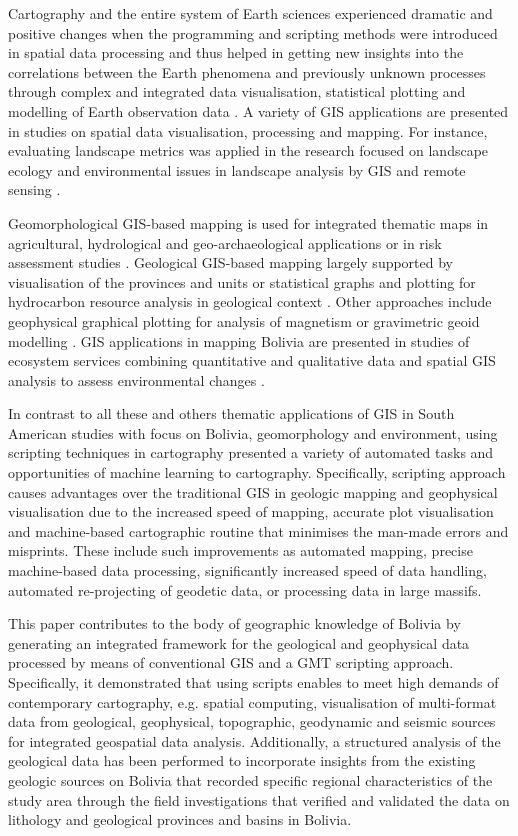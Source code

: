 \documentclass[data,article,submit,pdftex,moreauthors]{Definitions/mdpi}
\begin{document}
Cartography and the entire system of Earth sciences experienced dramatic and positive changes when the programming and scripting methods were introduced in spatial data processing and thus helped in getting new insights into the correlations between the Earth phenomena and previously unknown processes through complex and integrated data visualisation, statistical plotting and modelling of Earth observation data \cite{Bar,Lemenkova2019b,LOMBARDO,Lemenkova2020e}. A variety of GIS applications are presented in studies on spatial data visualisation, processing and mapping. For instance, evaluating landscape metrics was applied in the research focused on landscape ecology and environmental issues in landscape analysis by GIS and remote sensing \cite{Millington,Lemenkova202137}. 	

Geomorphological GIS-based mapping is used for integrated thematic maps in agricultural, hydrological and geo-archaeological applications or in risk assessment studies \cite{Vella,Lemenkova202120}. Geological GIS-based mapping largely supported by visualisation of the provinces and units \cite{Nedel} or statistical graphs and plotting for hydrocarbon resource analysis in geological context \cite{Jemio}. Other approaches include geophysical graphical plotting for analysis of magnetism \cite{Collinson,Ocola} or gravimetric geoid modelling \cite{Corchete}. GIS applications in mapping Bolivia are presented in studies of ecosystem services combining quantitative and qualitative data and spatial GIS analysis to assess environmental changes \cite{Hinojosa}. 

In contrast to all these and others thematic applications of GIS in South American studies with focus on Bolivia, geomorphology and environment, using scripting techniques in cartography presented a variety of automated tasks and opportunities of machine learning to cartography. Specifically, scripting approach causes advantages over the traditional GIS in geologic mapping and geophysical visualisation due to the increased speed of mapping, accurate plot visualisation and machine-based cartographic routine that minimises the man-made errors and misprints. These include such improvements as automated mapping, precise machine-based data processing, significantly increased speed of data handling, automated re-projecting of geodetic data, or processing data in large massifs.

This paper contributes to the body of geographic knowledge of Bolivia by generating an integrated framework for the geological and geophysical data processed by means of conventional GIS and a GMT scripting approach. Specifically, it demonstrated that  using scripts enables to meet high demands of contemporary cartography, e.g. spatial computing, visualisation of multi-format data from geological, geophysical, topographic, geodynamic and seismic sources for integrated geospatial data analysis. Additionally, a structured analysis of the geological data has been performed to incorporate insights from the existing geologic sources on Bolivia that recorded specific regional characteristics of the study area through the field investigations that verified and validated the data on lithology and geological provinces and basins in Bolivia.
\end{document}
